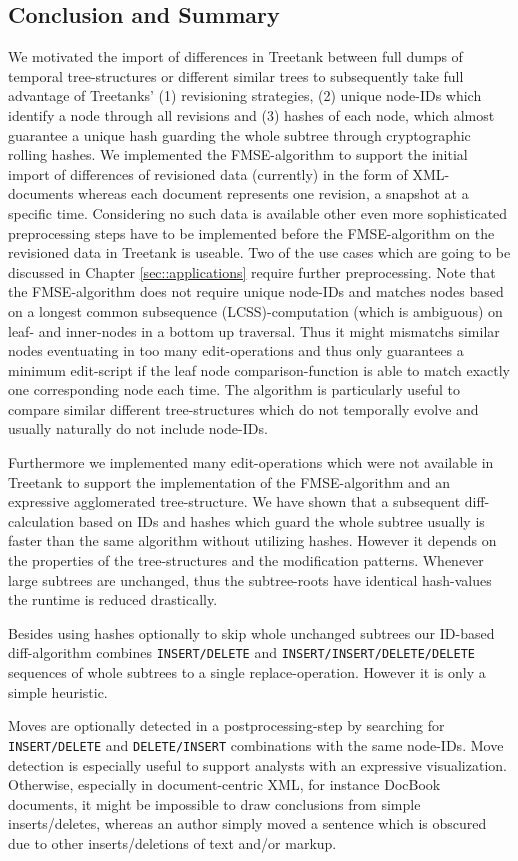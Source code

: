 \subsection{Conclusion and Summary}
We motivated the import of differences in Treetank between full dumps of temporal tree-structures or different similar trees to subsequently take full advantage of Treetanks' (1) revisioning strategies, (2) unique node-IDs which identify a node through all revisions and (3) hashes of each node, which almost guarantee a unique hash guarding the whole subtree through cryptographic rolling hashes. We implemented the FMSE-algorithm to support the initial import of differences of revisioned data (currently) in the form of XML-documents whereas each document represents one revision, a snapshot at a specific time. Considering no such data is available other even more sophisticated preprocessing steps have to be implemented before the FMSE-algorithm on the revisioned data in Treetank is useable. Two of the use cases which are going to be discussed in Chapter \ref{sec::applications} require further preprocessing. Note that the FMSE-algorithm does not require unique node-IDs and matches nodes based on a longest common subsequence (LCSS)-computation (which is ambiguous) on leaf- and inner-nodes in a bottom up traversal. Thus it might mismatchs similar nodes eventuating in too many edit-operations and thus only guarantees a minimum edit-script if the leaf node comparison-function is able to match exactly one corresponding node each time. The algorithm is particularly useful to compare similar different tree-structures which do not temporally evolve and usually naturally do not include node-IDs.

Furthermore we implemented many edit-operations which were not available in Treetank to support the implementation of the FMSE-algorithm and an expressive agglomerated tree-structure. We have shown that a subsequent diff-calculation based on IDs and hashes which guard the whole subtree usually is faster than the same algorithm without utilizing hashes. However it depends on the properties of the tree-structures and the modification patterns. Whenever large subtrees are unchanged, thus the subtree-roots have identical hash-values the runtime is reduced drastically.

Besides using hashes optionally to skip whole unchanged subtrees our ID-based diff-algorithm combines \texttt{INSERT/DELETE} and \texttt{INSERT/INSERT/DELETE/DELETE} sequences of whole subtrees to a single replace-operation. However it is only a simple heuristic.

Moves are optionally detected in a postprocessing-step by searching for \\\texttt{INSERT/DELETE} and \texttt{DELETE/INSERT} combinations with the same node-IDs. Move detection is especially useful to support analysts with an expressive visualization. Otherwise, especially in document-centric XML, for instance DocBook\cite{docbook} documents, it might be impossible to draw conclusions from simple inserts/deletes, whereas an author simply moved a sentence which is obscured due to other inserts/deletions of text and/or markup.
